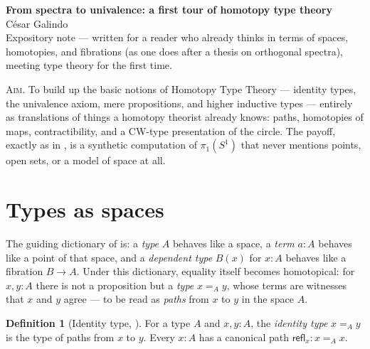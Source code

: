 \documentclass[11pt]{amsart}
\theoremstyle{plain}
\theoremstyle{definition}
\newtheorem{definition}[theorem]{Definition}
\theoremstyle{remark}
\newcommand{\refl}{\mathsf{refl}}
\newcommand{\Scirc}{S^1}
\begin{document}
\begin{center}
{\Large\bfseries From spectra to univalence: a first tour of homotopy type theory}\\[1em]
{\large César Galindo}\\[0.3em]
{\small Expository note --- written for a reader who already thinks in
terms of spaces, homotopies, and fibrations (as one does after a thesis
on orthogonal spectra), meeting type theory for the first time.}
\end{center}

\vspace{0.5em}

\begin{center}
\begin{minipage}{0.86\textwidth}
\small
\textsc{Aim.} To build up the basic notions of Homotopy Type Theory ---
identity types, the univalence axiom, mere propositions, and higher
inductive types --- entirely as translations of things a homotopy
theorist already knows: paths, homotopies of maps, contractibility, and
a CW-type presentation of the circle. The payoff, exactly as in
\cite[\S 8.1]{HoTTBook}, is a synthetic computation of $\pi_1(\Scirc)$
that never mentions points, open sets, or a model of space at all.
\end{minipage}
\end{center}

\vspace{1em}

\section{Types as spaces}\label{sec:types-as-spaces}

The guiding dictionary of \cite[\S 2.1]{HoTTBook} is: a \emph{type} $A$
behaves like a space, a \emph{term} $a:A$ behaves like a point of that
space, and a \emph{dependent type} $B(x)$ for $x:A$ behaves like a
fibration $B\to A$. Under this dictionary, equality itself becomes
homotopical: for $x,y:A$ there is not a proposition but a \emph{type}
$x=_A y$, whose terms are witnesses that $x$ and $y$ agree --- to be
read as \emph{paths} from $x$ to $y$ in the space $A$.

\begin{definition}[Identity type, {\cite[\S 1.12]{HoTTBook}}]\label{def:identity-type}
  For a type $A$ and $x,y:A$, the \emph{identity type} $x=_A y$ is the
  type of paths from $x$ to $y$. Every $x:A$ has a canonical path
  $\refl_x : x=_A x$.
\end{definition}
\end{document}
